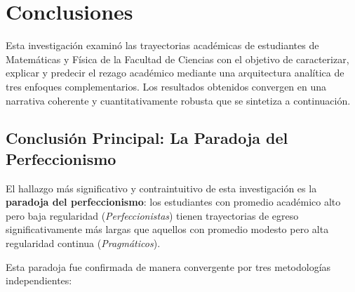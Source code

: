 \chapter{Conclusiones}
\label{ch:conclusiones}

Esta investigación examinó las trayectorias académicas de estudiantes de Matemáticas y Física
de la Facultad de Ciencias con el objetivo de caracterizar, explicar y predecir el rezago
académico mediante una arquitectura analítica de tres enfoques complementarios. Los resultados
obtenidos convergen en una narrativa coherente y cuantitativamente robusta que se sintetiza
a continuación.

\section{Conclusión Principal: La Paradoja del Perfeccionismo}

El hallazgo más significativo y contraintuitivo de esta investigación es la \textbf{paradoja
del perfeccionismo}: los estudiantes con promedio académico alto pero baja regularidad
(\emph{Perfeccionistas}) tienen trayectorias de egreso significativamente más largas que
aquellos con promedio modesto pero alta regularidad continua (\emph{Pragmáticos}).

Esta paradoja fue confirmada de manera convergente por tres metodologías independientes:

